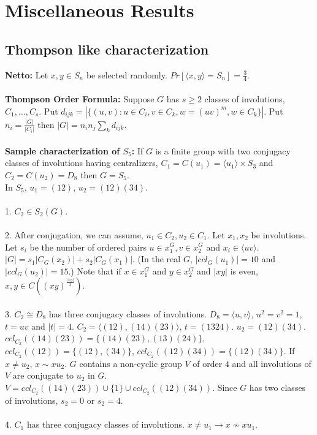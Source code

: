 \chapter{Miscellaneous Results}
\section{Thompson like characterization}
{\bf Netto:}  Let $x,y \in S_n$ be selected randomly.  
$Pr[ \langle x,y \rangle =S_n]= {\frac 3 4}$.  
\\
\\
{\bf Thompson Order Formula:} Suppose $G$ has $s\geq 2$ classes of involutions, $C_1, \ldots , C_s$.
Put $d_{ijk} = |\{ (u,v): u \in C_i, v \in C_k, w=(uv)^m, w \in C_k \}|$.  Put $n_i = {\frac {|G|} {|C_i|}}$ then
$|G| = n_i n_j \sum_k d_{ijk} $.
\\
\\
{\bf Sample characterization of $S_5$:}
If $G$ is a finite group with two conjugacy classes of involutions having
centralizers, $C_1= C(u_1) = \langle u_1 \rangle \times S_3$ and
$C_2= C(u_2) = D_8$ then $G = S_5$.
\\
In $S_5$, $u_1= (12)$, $u_2= (12)(34)$.
\\
\\
1. $C_2 \in S_2(G)$.
\\
\\
2.  After conjugation, we can assume, $u_1 \in C_2, u_2 \in C_1$.
Let $x_1, x_2$ be involutions.  Let $s_i$ be the number of ordered pairs
$u \in x_1^G, v \in x_2^G$ and $x_i \in \langle uv \rangle
$.  $|G|= s_1|C_G(x_2)| + s_2 |C_G(x_1)|$.
(In the real $G$, $|ccl_G(u_1)| = 10$ and $|ccl_G(u_2)|= 15$.)
Note that if 
$x \in x_1^G$ and $y \in x_2^G$ and $|xy|$ is even, $x,y \in C((xy)^{\frac {|xy|} 2})$.
\\
\\
3. 
$C_2 \cong D_8$ has three conjugacy classes of involutions.  
$D_8= \langle u, v \rangle $, $u^2=v^2=1$, $t= uv$ and $|t| = 4$.
$C_2= \langle (12),(14)(23) \rangle $, $t= (1324)$.
$u_2= (12)(34)$.
$ccl_{C_2}((14)(23))= \{ (14)(23), (13)(24) \}$,
$ccl_{C_2}((12))= \{ (12), (34) \}$,
$ccl_{C_2}((12)(34))= \{ (12)(34) \}$.  If $x \ne u_2$, $ x \sim x u_2$.
$G$ contains a non-cyclic group $V$ of order $4$
and all involutions of $V$ are conjugate to $u_2$ in $G$.
$V= ccl_{C_2}((14)(23)) \cup \{ 1 \} \cup ccl_{C_2}((12)(34))$.
Since $G$ has two classes of involutions, $s_2 = 0$ or $s_2 = 4$.
\\
\\
4.
$C_1$ has three conjugacy classes of involutions.  $x \ne u_1 \rightarrow x \nsim x u_1$.
